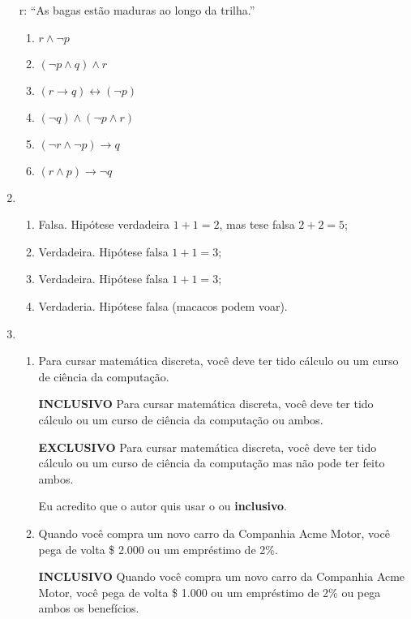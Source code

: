 \documentclass[12pt]{article}
\let\biconditional\leftrightarrow
\begin{document}
\begin{enumerate}
\begin{center}
            r: “As bagas estão maduras ao longo da trilha.”
        \end{center}
        \begin{enumerate}
            \item \( r \land \neg p \) 
            \item \( (\neg p \land q) \land r\)
            \item \( (r \to q) \biconditional (\neg p) \) 
            \item \( (\neg q) \land (\neg p \land r) \) 
            \item \( (\neg r \land \neg p) \to q \) 
            \item \( (r \land p) \to \neg q  \) 
        \end{enumerate}
    \item 
        \begin{enumerate}
            \item Falsa. Hipótese verdadeira \( 1 + 1 = 2 \), mas tese falsa \( 2 + 2 = 5\);
            \item Verdadeira. Hipótese falsa \( 1 + 1 = 3 \);
            \item Verdadeira. Hipótese falsa \( 1 + 1 = 3 \);
            \item Verdaderia. Hipótese falsa (macacos podem voar).
        \end{enumerate}
    \item 
        \begin{enumerate}
            \item Para cursar matemática discreta, você deve ter tido cálculo ou um curso de ciência da computação.

                \textbf{INCLUSIVO} Para cursar matemática discreta, você deve ter tido cálculo ou um curso de ciência da computação ou ambos.

                \textbf{EXCLUSIVO} Para cursar matemática discreta, você deve ter tido cálculo ou um curso de ciência da computação mas não pode ter feito ambos.

                Eu acredito que o autor quis usar o ou \textbf{inclusivo}. 

            \item Quando você compra um novo carro da Companhia Acme Motor, você pega de volta \$ 2.000 ou um empréstimo de 2\%.

                \textbf{INCLUSIVO} Quando você compra um novo carro da Companhia Acme Motor, você pega de volta \$ 1.000 ou um empréstimo de 2\% ou pega ambos os benefícios.


\end{enumerate}
\end{enumerate}
\end{document}
